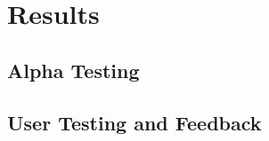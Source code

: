\chapter{Results}
\label{chapter3}


\section{Alpha Testing}







\section{User Testing and Feedback}
